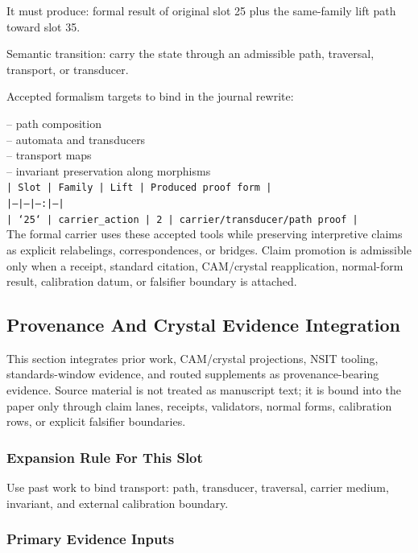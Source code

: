 \documentclass[11pt]{article}
\begin{document}
It must produce: formal result of original slot 25 plus the same-family lift path toward slot 35.

Semantic transition: carry the state through an admissible path, traversal, transport, or transducer.

Accepted formalism targets to bind in the journal rewrite:

\noindent{}-- path composition\\
\noindent{}-- automata and transducers\\
\noindent{}-- transport maps\\
\noindent{}-- invariant preservation along morphisms\\

\noindent\texttt{| Slot | Family | Lift | Produced proof form |}\\
\noindent\texttt{|---|---|---:|---|}\\
\noindent\texttt{| `25` | carrier\_action | 2 | carrier/transducer/path proof |}\\

The formal carrier uses these accepted tools while preserving interpretive
claims as explicit relabelings, correspondences, or bridges. Claim promotion is admissible only when a receipt, standard citation,
CAM/crystal reapplication, normal-form result, calibration datum, or falsifier
boundary is attached.

\subsection*{Provenance And Crystal Evidence Integration}

This section integrates prior work, CAM/crystal projections, NSIT tooling,
standards-window evidence, and routed supplements as provenance-bearing
evidence. Source material is not treated as manuscript text; it is bound into
the paper only through claim lanes, receipts, validators, normal forms,
calibration rows, or explicit falsifier boundaries.

\subsubsection*{Expansion Rule For This Slot}

Use past work to bind transport: path, transducer, traversal, carrier medium, invariant, and external calibration boundary.

\subsubsection*{Primary Evidence Inputs}
\end{document}
